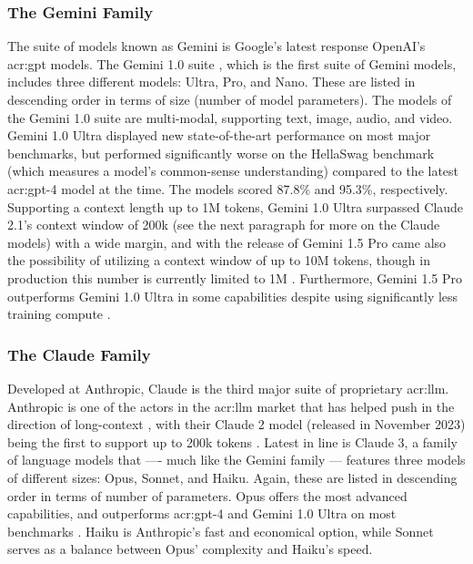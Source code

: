 \subsubsection{The Gemini Family}
\label{subsubsec:gemini}

The suite of models known as Gemini is Google's latest response OpenAI's \acrshort{acr:gpt} models. The Gemini 1.0 suite \citep{geminiteamGeminiFamilyHighly2024}, which is the first suite of Gemini models, includes three different models: Ultra, Pro, and Nano. These are listed in descending order in terms of size (number of model parameters). The models of the Gemini 1.0 suite are multi-modal, supporting text, image, audio, and video. Gemini 1.0 Ultra displayed new state-of-the-art performance on most major benchmarks, but performed significantly worse on the HellaSwag benchmark (which measures a model's common-sense understanding) compared to the latest \acrshort{acr:gpt}-4 model at the time. The models scored 87.8\% and 95.3\%, respectively. Supporting a context length up to 1M tokens, Gemini 1.0 Ultra surpassed Claude 2.1's context window of 200k (see the next paragraph for more on the Claude models) with a wide margin, and with the release of Gemini 1.5 Pro came also the possibility of utilizing a context window of up to 10M tokens, though in production this number is currently limited to 1M \citep{geminiteamGeminiUnlockingMultimodal2024, pichaiOurNextgenerationModel2024}. Furthermore, Gemini 1.5 Pro outperforms Gemini 1.0 Ultra in some capabilities despite using significantly less training compute \citep[31]{geminiteamGeminiUnlockingMultimodal2024}.

\subsubsection{The Claude Family}
\label{subsubsec:claude}

Developed at Anthropic, Claude is the third major suite of proprietary \acrshort{acr:llm}. Anthropic is one of the actors in the \acrshort{acr:llm} market that has helped push in the direction of long-context , with their Claude 2 model (released in November 2023) being the first to support up to 200k tokens \citep[9]{anthropicModelCardEvaluations2023}. Latest in line is Claude 3, a family of language models that ---- much like the Gemini family --- features three models of different sizes: Opus, Sonnet, and Haiku. Again, these are listed in descending order in terms of number of parameters. Opus offers the most advanced capabilities, and outperforms \acrshort{acr:gpt}-4 and Gemini 1.0 Ultra on most benchmarks \citep[6]{anthropicClaudeModelFamily2024}. Haiku is Anthropic's fast and economical option, while Sonnet serves as a balance between Opus' complexity and Haiku's speed.

